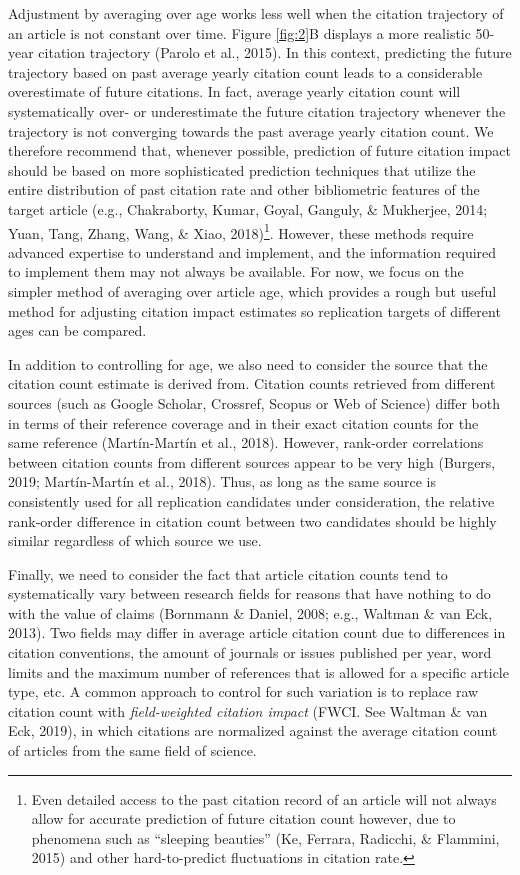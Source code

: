 \documentclass[
  english,
  man,floatsintext]{apa6}
\begin{document}
Adjustment by averaging over age works less well when the citation trajectory of an article is not constant over time. Figure \ref{fig:2}B displays a more realistic 50-year citation trajectory (Parolo et al., 2015). In this context, predicting the future trajectory based on past average yearly citation count leads to a considerable overestimate of future citations. In fact, average yearly citation count will systematically over- or underestimate the future citation trajectory whenever the trajectory is not converging towards the past average yearly citation count. We therefore recommend that, whenever possible, prediction of future citation impact should be based on more sophisticated prediction techniques that utilize the entire distribution of past citation rate and other bibliometric features of the target article (e.g., Chakraborty, Kumar, Goyal, Ganguly, \& Mukherjee, 2014; Yuan, Tang, Zhang, Wang, \& Xiao, 2018)\footnote{Even detailed access to the past citation record of an article will not always allow for accurate prediction of future citation count however, due to phenomena such as ``sleeping beauties'' (Ke, Ferrara, Radicchi, \& Flammini, 2015) and other hard-to-predict fluctuations in citation rate.}. However, these methods require advanced expertise to understand and implement, and the information required to implement them may not always be available. For now, we focus on the simpler method of averaging over article age, which provides a rough but useful method for adjusting citation impact estimates so replication targets of different ages can be compared.

In addition to controlling for age, we also need to consider the source that the citation count estimate is derived from. Citation counts retrieved from different sources (such as Google Scholar, Crossref, Scopus or Web of Science) differ both in terms of their reference coverage and in their exact citation counts for the same reference (Martín-Martín et al., 2018). However, rank-order correlations between citation counts from different sources appear to be very high (Burgers, 2019; Martín-Martín et al., 2018). Thus, as long as the same source is consistently used for all replication candidates under consideration, the relative rank-order difference in citation count between two candidates should be highly similar regardless of which source we use.

Finally, we need to consider the fact that article citation counts tend to systematically vary between research fields for reasons that have nothing to do with the value of claims (Bornmann \& Daniel, 2008; e.g., Waltman \& van Eck, 2013). Two fields may differ in average article citation count due to differences in citation conventions, the amount of journals or issues published per year, word limits and the maximum number of references that is allowed for a specific article type, etc. A common approach to control for such variation is to replace raw citation count with \emph{field-weighted citation impact} (FWCI. See Waltman \& van Eck, 2019), in which citations are normalized against the average citation count of articles from the same field of science.
\end{document}

